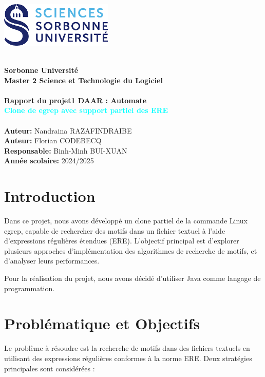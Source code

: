 \documentclass{article}
\begin{document}
\begin{titlepage}
    \centering
    \includegraphics[width=0.4\textwidth]{resourse/logoSorbonne.png}
    \begin{center}
        \hrulefill \\[1cm]
        \Huge\textbf{Sorbonne Université} \\[1cm]
        \Large\textbf{Master 2 Science et Technologie du Logiciel} \\ [1cm]
        \hrulefill \\[2cm]
        \huge\textbf{Rapport du projet1 DAAR : Automate } \\[1cm]
        \huge\textbf{\textcolor{cyan}{Clone de egrep avec support partiel des ERE}} \\[2cm]
        \hrulefill \\[2.5cm]
        \Large\textbf{Auteur:} Nandraina RAZAFINDRAIBE\\[0.5cm]
        \Large\textbf{Auteur:} Florian CODEBECQ\\[0.5cm]
        \Large\textbf{Responsable:} Binh-Minh BUI-XUAN\\[2.5cm]
        \textbf{Année scolaire:} 2024/2025  
    \end{center}
\end{titlepage}

\newpage
\setcounter{page}{1}

\setcounter{section}{0}
\section{Introduction}
Dans ce projet, nous avons développé un clone partiel de la commande Linux egrep, capable de rechercher des motifs dans un fichier textuel à l'aide d'expressions régulières étendues (ERE). L'objectif principal est d'explorer plusieurs approches d'implémentation des algorithmes de recherche de motifs, et d'analyser leurs performances.

Pour la réalisation du projet, nous avons décidé d'utiliser Java comme langage de programmation.

\section{Problématique et Objectifs}
Le problème à résoudre est la recherche de motifs dans des fichiers textuels en utilisant des expressions régulières conformes à la norme ERE. Deux stratégies principales sont considérées :
\end{document}
